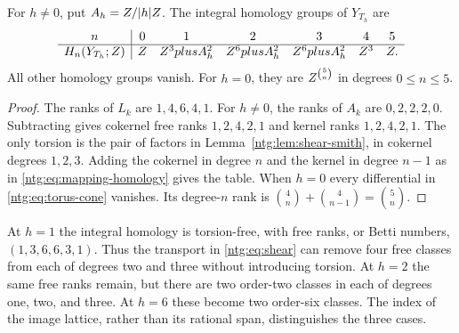 \begin{theorem}\label{ntg:thm:shear-homology}
For $h\ne0$, put $A_h=Z/|h|Z$. The integral homology groups
of $Y_{T_h}$ are
\begin{equation}\label{ntg:eq:shear-homology}
\begin{array}{c|cccccc}
 n&0&1&2&3&4&5\\ \hline
 H_n(Y_{T_h};Z)&Z&Z^3plus A_h^2&Z^6plus A_h^2&
 Z^6plus A_h^2&Z^3&Z.
\end{array}
\end{equation}
All other homology groups vanish. For $h=0$, they are
$Z^{\binom5n}$ in degrees $0\le n\le5$.
\end{theorem}
\begin{proof}
The ranks of $L_k$ are $1,4,6,4,1$. For $h\ne0$, the ranks of
$A_k$ are $0,2,2,2,0$. Subtracting gives cokernel free ranks
$1,2,4,2,1$ and kernel ranks $1,2,4,2,1$.
The only torsion is the pair of factors in
Lemma~\ref{ntg:lem:shear-smith}, in cokernel degrees $1,2,3$.
Adding the cokernel in degree $n$ and the kernel in degree $n-1$
as in \eqref{ntg:eq:mapping-homology} gives the table. When $h=0$ every
differential in \eqref{ntg:eq:torus-cone} vanishes. Its degree-$n$ rank
is $\binom4n+\binom4{n-1}=\binom5n$.
\end{proof}

At $h=1$ the integral homology is torsion-free, with free ranks, or
Betti numbers, $(1,3,6,6,3,1)$. Thus the transport in
\eqref{ntg:eq:shear} can remove four
free classes from each of degrees two and three without introducing
torsion. At $h=2$ the same free ranks remain, but there are two
order-two classes in each of degrees one, two, and three. At $h=6$
these become two order-six classes. The index of the image lattice,
rather than its rational span, distinguishes the three cases.

